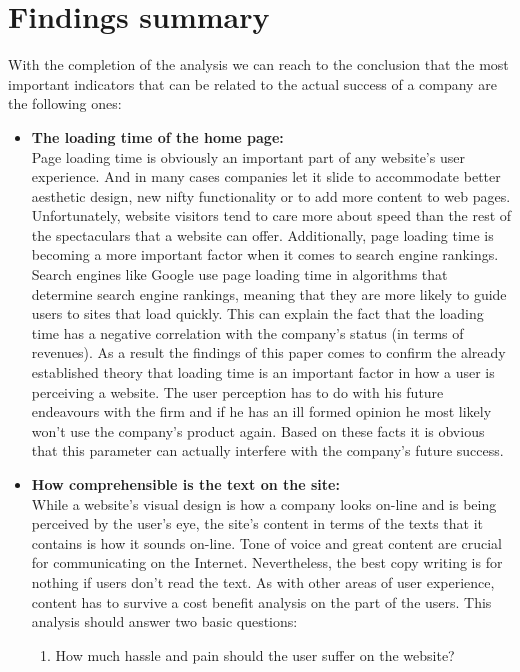 \documentclass{book}
\begin{document}
\section{Findings summary}
With the completion of the analysis we can reach to the conclusion that the most important indicators that can be related to the actual success of a company are the following ones:
\begin{itemize}
\item  \textbf{The loading time of the home page:} \\
Page loading time is obviously an important part of any website's user experience. And in many cases companies let it slide to accommodate better aesthetic design, new nifty functionality or to add more content to web pages. Unfortunately, website visitors tend to care more about speed than the rest of the spectaculars that a website can offer. Additionally, page loading time is becoming a more important factor when it comes to search engine rankings.\\
Search engines like Google use page loading time in algorithms that determine search engine rankings, meaning that they are more likely to guide users to sites that load quickly. This can explain the fact that the loading time has a negative correlation with the company's status (in terms of revenues). As a result the findings of this paper comes to confirm the already established theory that loading time is an important factor in how a user is perceiving a website. The user perception has to do with his future endeavours with the firm and if he has an ill formed opinion he most likely won't use the company's product again. Based on these facts it is obvious that this parameter can actually interfere with the company's future success. 
\item  \textbf{How comprehensible is the text on the site:} \\
While a website's visual design is how a company looks on-line and is being perceived by the user's eye, the site's content in terms of the texts that it contains is how it sounds on-line. Tone of voice and great content are crucial for communicating on the Internet. Nevertheless, the best copy writing is for nothing if users don't read the text. As with other areas of user experience, content has to survive a cost benefit analysis on the part of the users. This analysis should answer two basic questions:
\begin{enumerate}
\item How much hassle and pain should the user suffer on the website?

\end{enumerate}
\end{itemize}
\end{document}
